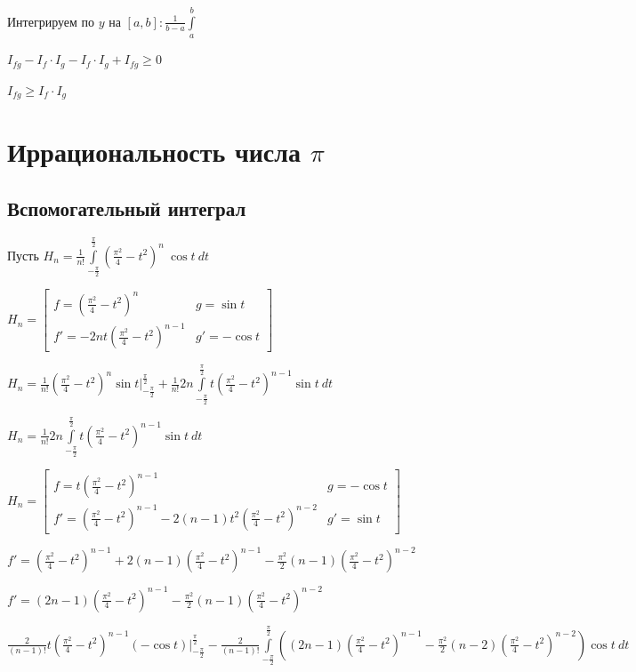 \documentclass{article}
\begin{document}
			Интегрируем по $y$ на $[a, b] : \frac{1}{b - a} \int\limits^b_a$
			
			$I_{fg} - I_f \cdot I_g - I_f \cdot I_g + I_{fg} \geq 0$
			
			$I_{fg} \geq I_f \cdot I_g$
	
	\newpage
	
	\section{Иррациональность числа $\pi$}
	
		\subsection{Вспомогательный интеграл}
		
			Пусть $H_n = \frac{1}{n!} \int\limits^{\frac{\pi}{2}}_{-\frac{\pi}{2}} (\frac{\pi^2}{4}-t^2)^n \ \cos t \ dt$
			
			$H_n = \begin{bmatrix} f = (\frac{\pi^2}{4} - t^2)^n & g = \sin t \\ f' = -2nt (\frac{\pi^2}{4} - t^2)^{n - 1} & g' = -\cos t \end{bmatrix}$
			
			$H_n = \frac{1}{n!} (\frac{\pi^2}{4} - t^2)^n \sin t \bigg|^{\frac{\pi}{2}}_{-\frac{\pi}{2}} + \frac{1}{n!} 2n \int\limits^{\frac{\pi}{2}}_{-\frac{\pi}{2}} t (\frac{\pi^2}{4}-t^2)^{n - 1} \sin t \ dt$
			
			$H_n = \frac{1}{n!} 2n \int\limits^{\frac{\pi}{2}}_{-\frac{\pi}{2}} t (\frac{\pi^2}{4}-t^2)^{n - 1} \sin t \ dt$
			
			$H_n = \begin{bmatrix} f = t (\frac{\pi^2}{4} - t^2)^{n - 1} & g = -\cos t \\ f' = (\frac{\pi^2}{4} - t^2)^{n - 1} - 2(n - 1)t^2(\frac{\pi^2}{4} - t^2)^{n - 2} & g' = \sin t \end{bmatrix}$
			
			$f' = (\frac{\pi^2}{4} - t^2)^{n - 1} + 2(n - 1)(\frac{\pi^2}{4} - t^2)^{n - 1} - \frac{\pi^2}{2} (n - 1) (\frac{\pi^2}{4} - t^2)^{n - 2}$
			
			$f' = (2n - 1)(\frac{\pi^2}{4} - t^2)^{n - 1} - \frac{\pi^2}{2}(n - 1)(\frac{\pi^2}{4}-t^2)^{n - 2}$
			
			$\frac{2}{(n - 1)!} t (\frac{\pi^2}{4} - t^2)^{n - 1} (-\cos t) \bigg|^{\frac{\pi}{2}}_{-\frac{\pi}{2}} - \frac{2}{(n - 1)!} \int\limits^{\frac{\pi}{2}}_{-\frac{\pi}{2}} ( (2n - 1)(\frac{\pi^2}{4} - t^2)^{n - 1} - \frac{\pi^2}{2} (n - 2) (\frac{\pi^2}{4} - t^2)^{n - 2}) \cos t \ dt$
			
\end{document}
